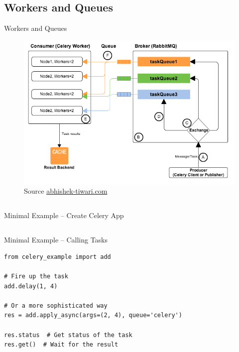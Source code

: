 \documentclass[xcolor=x11names,compress,t]{beamer}
\renewcommand{\(}{\begin{columns}[T]}
\renewcommand{\)}{\end{columns}}
\newcommand{\<}[1]{\begin{column}{#1}}
\renewcommand{\>}{\end{column}}
\newenvironment{slide}[1]{\subsection{#1} \begin{frame}{#1}}{\end{frame}}
\begin{document}
\begin{slide}{Workers and Queues}
    \begin{figure}
        \includegraphics[scale=0.45]{celery-queues-and-workers}
        \caption{Source \href{https://abhishek-tiwari.com/post/amqp-rabbitmq-and-celery-a-visual-guide-for-dummies}{abhishek-tiwari.com}}
    \end{figure}
\end{slide} 

\subsection{}
\begin{frame}[fragile]{Minimal Example -- Create Celery App}
\end{frame}

\subsection{}
\begin{frame}[fragile]{Minimal Example -- Calling Tasks}
\begin{verbatim}
from celery_example import add

# Fire up the task
add.delay(1, 4)

# Or a more sophisticated way
res = add.apply_async(args=(2, 4), queue='celery')

res.status  # Get status of the task
res.get()  # Wait for the result
\end{verbatim}
\end{frame}
\end{document}
